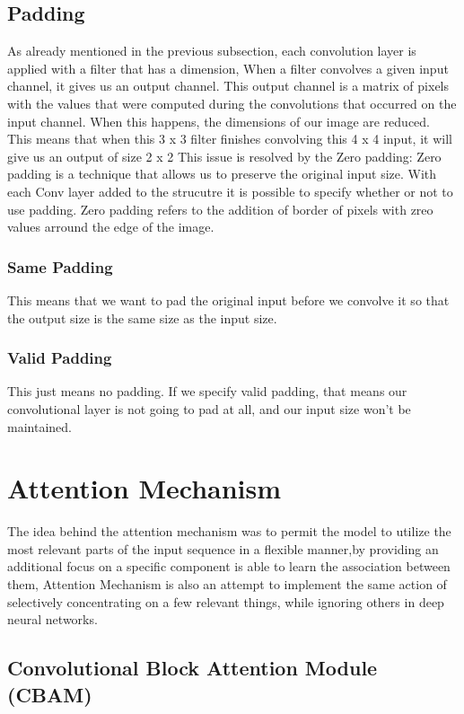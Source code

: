 \subsection{Padding}
As already mentioned in the previous subsection, each convolution layer is applied
with a filter that has a dimension, When a filter convolves a given input channel, it gives
us an output channel. This output channel is a matrix of pixels with the values that
were computed during the convolutions that occurred on the input channel. When this
happens, the dimensions of our image are reduced.\vspace{4mm} \\
This means that when this 3 x 3 filter finishes convolving this 4 x 4 input, it will give
us an output of size 2 x 2 This issue is resolved by the Zero padding: Zero padding is a
technique that allows us to preserve the original input size. With each Conv layer added
to the strucutre it is possible to specify whether or not to use padding. Zero padding
refers to the addition of border of pixels with zreo values arround the edge of the image.

\subsubsection{Same Padding}
This means that we want to pad the original input before we convolve
it so that the output size is the same size as the input size.

\subsubsection{Valid Padding} This just means no padding. If we specify valid padding, that means
our convolutional layer is not going to pad at all, and our input size won’t be maintained.
\section{Attention Mechanism}
The idea behind the attention mechanism was to permit the model to utilize the most relevant parts of the input sequence in a flexible manner,by providing an additional focus on a specific component
is able to learn the association between them,
Attention Mechanism is also an attempt to implement the same action of selectively concentrating on a few relevant things, while ignoring others in deep neural networks.\cite{art44}


\subsection{Convolutional Block Attention Module (CBAM)}

